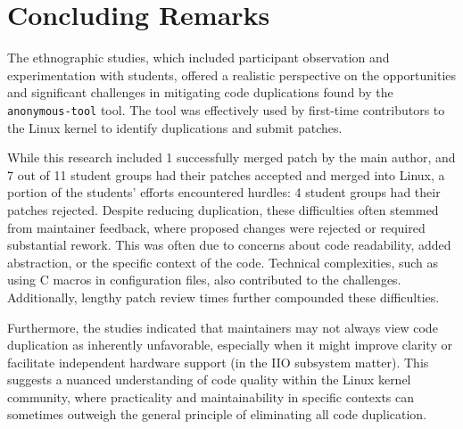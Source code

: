 \documentclass[10pt,conference]{IEEEtran}
\begin{document}
\section{Concluding Remarks}

The ethnographic studies, which included participant observation and experimentation with students, offered a realistic perspective on the opportunities and significant challenges in mitigating code duplications found by the \texttt{anonymous-tool} tool. The tool was effectively used by first-time contributors to the Linux kernel to identify duplications and submit patches.

While this research included 1 successfully merged patch by the main author, and 7 out of 11 student groups had their patches accepted and merged into Linux, a portion of the students' efforts encountered hurdles: 4 student groups had their patches rejected.
Despite reducing duplication, these difficulties often stemmed from maintainer feedback, where proposed changes were rejected or required substantial rework. This was often due to concerns about code readability, added abstraction, or the specific context of the code. Technical complexities, such as using C macros in configuration files, also contributed to the challenges. Additionally, lengthy patch review times further compounded these difficulties.

Furthermore, the studies indicated that maintainers may not always view code duplication as inherently unfavorable, especially when it might improve clarity or facilitate independent hardware support (in the IIO subsystem matter). This suggests a nuanced understanding of code quality within the Linux kernel community, where practicality and maintainability in specific contexts can sometimes outweigh the general principle of eliminating all code duplication.






\end{document}

